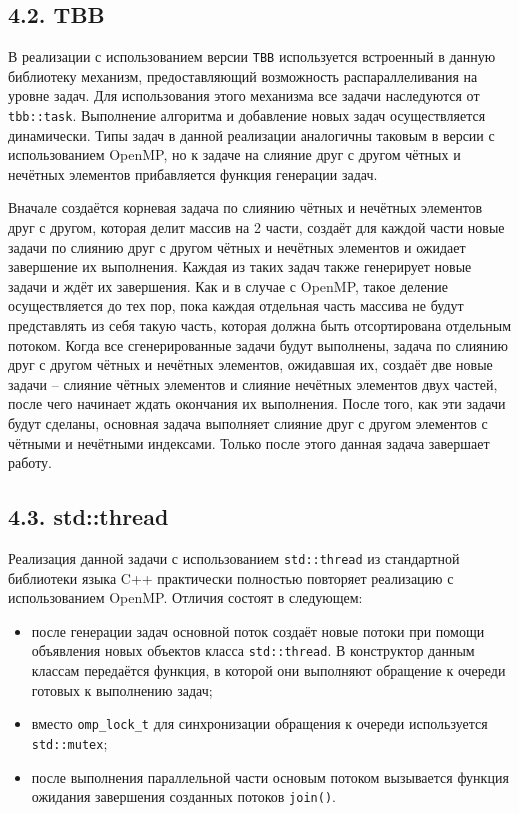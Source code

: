 \documentclass{report}
\begin{document}
    \subsection*{4.2. TBB}
    \par В реализации с использованием версии \verb|TBB| используется встроенный в данную библиотеку механизм, предоставляющий возможность распараллеливания на уровне задач. Для использования этого механизма все задачи наследуются от \verb|tbb::task|. Выполнение алгоритма и добавление новых задач осуществляется динамически. Типы задач в данной реализации аналогичны таковым в версии с использованием OpenMP, но к задаче на слияние друг с другом чётных и нечётных элементов прибавляется функция генерации задач.
    \par Вначале создаётся корневая задача по слиянию чётных и нечётных элементов друг с другом, которая делит массив на 2 части, создаёт для каждой части новые задачи по слиянию друг с другом чётных и нечётных элементов и ожидает завершение их выполнения. Каждая из таких задач также генерирует новые задачи и ждёт их завершения. Как и в случае с OpenMP, такое деление осуществляется до тех пор, пока каждая отдельная часть массива не будут представлять из себя такую часть, которая должна быть отсортирована отдельным потоком. Когда все сгенерированные задачи будут выполнены, задача по слиянию друг с другом чётных и нечётных элементов, ожидавшая их, создаёт две новые задачи -- слияние чётных элементов и слияние нечётных элементов двух частей, после чего начинает ждать окончания их выполнения. После того, как эти задачи будут сделаны, основная задача выполняет слияние друг с другом элементов с чётными и нечётными индексами. Только после этого данная задача завершает работу.

    \subsection*{4.3. std::thread}
    Реализация данной задачи с использованием \verb|std::thread| из стандартной библиотеки языка C++ практически полностью повторяет реализацию с использованием OpenMP. Отличия состоят в следующем:
    \begin{itemize}
        \item после генерации задач основной поток создаёт новые потоки при помощи объявления новых объектов класса \verb|std::thread|. В конструктор данным классам передаётся функция, в которой они выполняют обращение к очереди готовых к выполнению задач;
        \item вместо \verb|omp_lock_t| для синхронизации обращения к очереди используется \verb|std::mutex|;
        \item после выполнения параллельной части основым потоком вызывается функция ожидания завершения созданных потоков \verb|join()|.
    \end{itemize}
\end{document}
